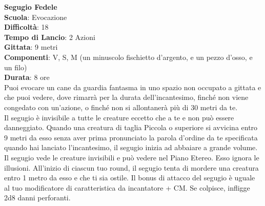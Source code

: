 \begin{multicols}{2}
\medskip\textbf{Segugio Fedele}\\
\textbf{Scuola}: Evocazione\\
\textbf{Difficoltà}: 18\\
\textbf{Tempo di Lancio}: 2 Azioni\\
\textbf{Gittata}: 9 metri\\
\textbf{Componenti}: V, S, M (un minuscolo fischietto d'argento, e un pezzo d'osso, e un filo)\\
\textbf{Durata}: 8 ore\\
Puoi evocare un cane da guardia fantasma in uno spazio non occupato a gittata e che puoi vedere, dove rimarrà per la durata dell'incantesimo, finché non viene congedato con un'azione, o finché non si allontanerà più di 30 metri da te.\\
Il segugio è invisibile a tutte le creature eccetto che a te e non può essere danneggiato. Quando una creatura di taglia Piccola o superiore si avvicina entro 9 metri da esso senza aver prima pronunciato la parola d'ordine da te specificata quando hai lanciato l'incantesimo, il segugio inizia ad abbaiare a grande volume. Il segugio vede le creature invisibili e può vedere nel Piano Etereo. Esso ignora le illusioni. All'inizio di ciascun tuo round, il segugio tenta di mordere una creatura entro 1 metro da esso e che ti sia ostile. Il bonus di attacco del segugio è uguale al tuo modificatore di caratteristica da incantatore + CM. Se colpisce, infligge 2d8 danni perforanti.


\end{multicols}
